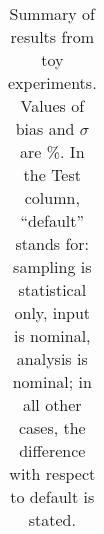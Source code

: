 \begin{table}
\begin{center}
\begin{tabular}{c | c  | c c | c c | c c | c c | c c }
\hline
\hline
\end{tabular}
\caption{Summary of results from toy experiments. Values of bias and $\sigma$ are \%.
In the Test column, ``default'' stands for: sampling is statistical only, input is nominal, analysis is nominal; 
in all other cases, the difference with respect to default is stated.}
\label{tab:toy_summary}
\end{center}
\end{table}


